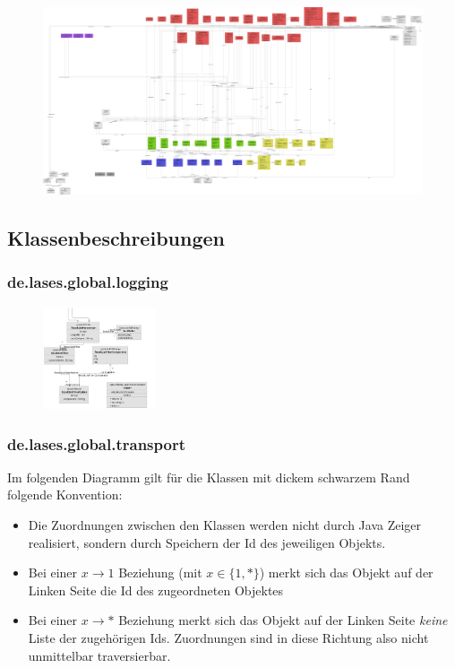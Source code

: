 \begin{figure}[H]
	\centering
	\includegraphics[width=\linewidth]{graphics/klassendiagramm_png}
\end{figure}


\subsection{Klassenbeschreibungen}

\subsubsection{de.lases.global.logging}

\begin{figure}[H]
	\centering
	\includegraphics[height=3cm]{graphics/global_util}
\end{figure}


\subsubsection{de.lases.global.transport}

Im folgenden Diagramm gilt für die Klassen mit dickem schwarzem Rand folgende Konvention:
\begin{itemize}
	\item Die Zuordnungen zwischen den Klassen werden nicht durch Java Zeiger realisiert, sondern durch Speichern der Id des jeweiligen Objekts.
	\item Bei einer $x \rightarrow 1$ Beziehung (mit $x \in \{1, *\}$) merkt sich das Objekt auf der Linken Seite die Id des zugeordneten Objektes
	\item Bei einer $x \rightarrow *$ Beziehung merkt sich das Objekt auf der Linken Seite \emph{keine} Liste der zugehörigen Ids. Zuordnungen sind in diese Richtung also nicht unmittelbar traversierbar.
\end{itemize}


